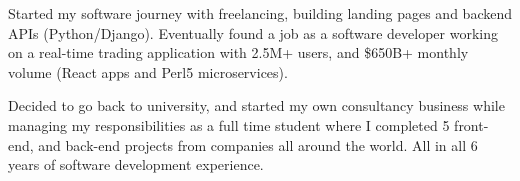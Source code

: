 

\begin{cvparagraph}


Started my software journey with freelancing, building landing pages and backend APIs (Python/Django). Eventually found a job as a software developer working on a real-time trading application with 2.5M+ users, and \$650B+ monthly volume (React apps and Perl5 microservices). 

Decided to go back to university, and started my own consultancy business while managing my responsibilities as a full time student where I completed 5 front-end, and back-end projects from companies all around the world. All in all 6 years of software development experience.

\end{cvparagraph}

